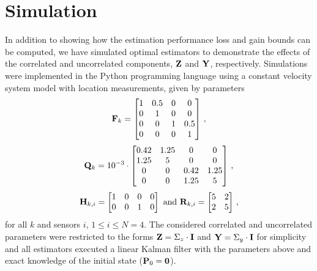 \documentclass[letterpaper, 10 pt, conference]{ieeeconf}
\begin{document}
\section{Simulation}\label{sec:sim}
In addition to showing how the estimation performance loss and gain bounds can be computed, we have simulated optimal estimators to demonstrate the effects of the correlated and uncorrelated components, ${{\mathbf{Z}}}$ and ${{\mathbf{Y}}}$, respectively. Simulations were implemented in the Python programming language using a constant velocity system model with location measurements, given by parameters
\begin{equation}
  {\ensuremath{{\mathbf{F}}}}_k=
  \begin{bmatrix}
     1 & 0.5 & 0 & 0\\
     0 & 1 & 0 & 0\\
     0 & 0 & 1 & 0.5\\
     0 & 0 & 0 & 1
  \end{bmatrix}\,,
\end{equation}
\begin{equation}
  {\ensuremath{{\mathbf{Q}}}}_k=10^{-3}\cdot
  \begin{bmatrix}
     0.42 & 1.25 & 0 & 0\\
     1.25 & 5 & 0 & 0\\
     0 & 0 & 0.42 & 1.25\\
     0 & 0 & 1.25 & 5
  \end{bmatrix}\,,
\end{equation}
\begin{equation}
  {\ensuremath{{\mathbf{H}}}}_{k,i}=
  \begin{bmatrix}
     1 & 0 & 0 & 0\\
     0 & 0 & 1 & 0
  \end{bmatrix}
  \text{ and }
  {\ensuremath{{\mathbf{R}}}}_{k,i}=
  \begin{bmatrix}
     5 & 2\\
     2 & 5
  \end{bmatrix}\,,
\end{equation}
for all $k$ and sensors $i$, $1\leq i \leq N=4$. The considered correlated and uncorrelated parameters were restricted to the forms ${{\mathbf{Z}}}=\Sigma_z\cdot{\ensuremath{{\mathbf{I}}}}$ and ${{\mathbf{Y}}}=\Sigma_y\cdot{\ensuremath{{\mathbf{I}}}}$ for simplicity and all estimators executed a linear Kalman filter with the parameters above and exact knowledge of the initial state (${{\mathbf{P}}}_0={{\mathbf{0}}}$).
\end{document}
